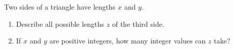 Two sides of a triangle have lengths $x$ and $y$.
\begin{enumerate}
\item[(a)] Describe all possible lengths $z$ of the third side.
\item[(b)] If $x$ and $y$ are positive integers, how many integer values can $z$ take?
\end{enumerate}
